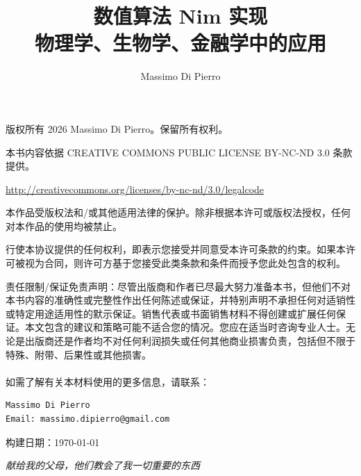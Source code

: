 \documentclass[justified, sixbynine]{tufte-book}
\title[数值算法 Nim 实现]{\LARGE 数值算法 Nim 实现\\[0.5em]
       \large 物理学、生物学、金融学中的应用}
\author{Massimo Di Pierro}
\theoremstyle{plain}%
\newtheorem * {corollary}{推论}
\theoremstyle{definition}
\theoremstyle{remark}
\newtheorem * {remark}{注记}
\newtheorem * {note}{注释}
\begin{document}
\frontmatter

\maketitle

\thispagestyle{empty}
\setlength{\parindent}{0pt}
\setlength{\parskip}{2mm}
{\footnotesize
\vskip 1in
版权所有 2026 Massimo Di Pierro。保留所有权利。
\vskip 1cm

本书内容依据 CREATIVE COMMONS PUBLIC LICENSE BY-NC-ND 3.0 条款提供。

\url{http://creativecommons.org/licenses/by-nc-nd/3.0/legalcode}

本作品受版权法和/或其他适用法律的保护。除非根据本许可或版权法授权，任何对本作品的使用均被禁止。

行使本协议提供的任何权利，即表示您接受并同意受本许可条款的约束。如果本许可被视为合同，则许可方基于您接受此类条款和条件而授予您此处包含的权利。

责任限制/保证免责声明：尽管出版商和作者已尽最大努力准备本书，但他们不对本书内容的准确性或完整性作出任何陈述或保证，并特别声明不承担任何对适销性或特定用途适用性的默示保证。销售代表或书面销售材料不得创建或扩展任何保证。本文包含的建议和策略可能不适合您的情况。您应在适当时咨询专业人士。无论是出版商还是作者均不对任何利润损失或任何其他商业损害负责，包括但不限于特殊、附带、后果性或其他损害。\\ \\

如需了解有关本材料使用的更多信息，请联系：

\begin{verbatim}
Massimo Di Pierro
Email: massimo.dipierro@gmail.com
\end{verbatim}

构建日期：\today
}

\newpage
\thispagestyle{empty}
\phantom{placeholder}
\vspace{2in}
\begin{flushright}
{\it 献给我的父母，他们教会了我一切重要的东西}
\end{flushright}
\newpage
\thispagestyle{empty}
\phantom {a}
\newpage

\setlength{\cftparskip}{\baselineskip}
\tableofcontents
\end{document}

